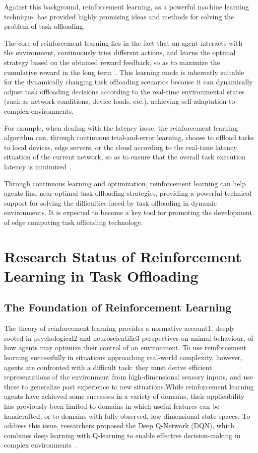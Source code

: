 \documentclass[journal]{IEEEtran}
\begin{document}
Against this background, reinforcement learning, as a powerful machine learning technique, has provided highly promising ideas and methods for solving the problem of task offloading.

The core of reinforcement learning lies in the fact that an agent interacts with the environment, 
continuously tries different actions, and learns the optimal strategy based on the obtained reward feedback, 
so as to maximize the cumulative reward in the long term~\cite{zheng05}. 
This learning mode is inherently suitable for the dynamically changing task offloading scenarios 
because it can dynamically adjust task offloading decisions according to the real-time environmental states 
(such as network conditions, device loads, etc.), achieving self-adaptation to complex environments.

For example, when dealing with the latency issue, the reinforcement learning algorithm can, through continuous trial-and-error learning, choose to offload tasks to local devices, edge servers, or the cloud according to the real-time latency situation of the current network, so as to ensure that the overall task execution latency is minimized~\cite{zheng06}.

Through continuous learning and optimization, reinforcement learning can help agents find near-optimal task offloading strategies, providing a powerful technical support for solving the difficulties faced by task offloading in dynamic environments. It is expected to become a key tool for promoting the development of edge computing task offloading technology.

\section{Research Status of Reinforcement Learning in Task Offloading}

\subsection{The Foundation of Reinforcement Learning}
The theory of reinforcement learning provides a normative account1, deeply rooted in psychological2 and neuroscientific3 perspectives on animal behaviour, of how agents may optimize their control of an environment. To use reinforcement learning successfully in situations approaching real-world complexity, however, agents are confronted with a difficult task: they must derive efficient representations of the environment from high-dimensional sensory inputs, and use these to generalize past experience to new situations.While reinforcement learning agents have achieved some successes in a variety of domains, their applicability has previously been limited to domains in which useful features can be handcrafted, or to domains with fully observed, low-dimensional state spaces. To address this issue, researchers proposed the Deep Q-Network (DQN), which combines deep learning with Q-learning to enable effective decision-making in complex environments~\cite{pyyz001}.
\end{document}
